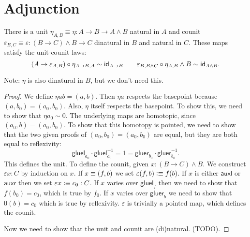 \documentclass{article}
\newcommand{\pmap}{\to}
\renewcommand{\smash}{\wedge}
\renewcommand{\epsilon}{\varepsilon}
\newcommand{\tr}{\cdot}
\renewcommand{\o}{\ensuremath{\circ}}
\newcommand{\auxl}{\mathsf{auxl}}
\newcommand{\auxr}{\mathsf{auxr}}
\newcommand{\gluel}{\mathsf{gluel}}
\newcommand{\gluer}{\mathsf{gluer}}
\newcommand{\sy}{^{-1}}
\begin{document}
\section{Adjunction}

\begin{lem}
  There is a unit $\eta_{A,B}\equiv\eta:A\pmap B\pmap A\smash B$ natural in $A$ and counit
  $\epsilon_{B,C}\equiv\epsilon : (B\pmap C)\smash B \pmap C$ dinatural in $B$ and natural in $C$.
  These maps satisfy the unit-counit laws:
  $$(A\to\epsilon_{A,B})\o \eta_{A\to B,A}\sim \idfunc[A\to B]\qquad
  \epsilon_{B,B\smash C}\o \eta_{A,B}\smash B\sim\idfunc[A\smash B].$$
\end{lem}
Note: $\eta$ is also dinatural in $B$, but we don't need this.
\begin{proof}
  We define $\eta ab=(a,b)$. Then $\eta a$ respects the basepoint because
  $(a,b_0)=(a_0,b_0)$. Also, $\eta$ itself respects the basepoint. To show this, we need to show
  that $\eta a_0\sim0$. The underlying maps are homotopic, since $(a_0,b)=(a_0,b_0)$. To show that
  this homotopy is pointed, we need to show that the two given proofs of $(a_0,b_0)=(a_0,b_0)$ are
  equal, but they are both equal to reflexivity:
  $$\gluel_{a_0}\tr\gluel_{a_0}\sy=1=\gluer_{b_0}\tr\gluer_{b_0}\sy.$$
  This defines the unit. To define the counit, given $x:(B\pmap C)\smash B$. We construct
  $\epsilon x:C$ by induction on $x$. If $x\equiv(f,b)$ we set $\epsilon(f,b)\defeq f(b)$. If $x$
  is either $\auxl$ or $\auxr$ then we set $\epsilon x\defeq c_0:C$. If $x$ varies over $\gluel_f$
  then we need to show that $f(b_0)=c_0$, which is true by $f_0$. If $x$ varies over $\gluer_b$ we
  need to show that $0(b)=c_0$ which is true by reflexivity. $\epsilon$ is trivially a pointed map,
  which defines the counit.

  Now we need to show that the unit and counit are (di)natural. (TODO).


\end{proof}
\end{document}
